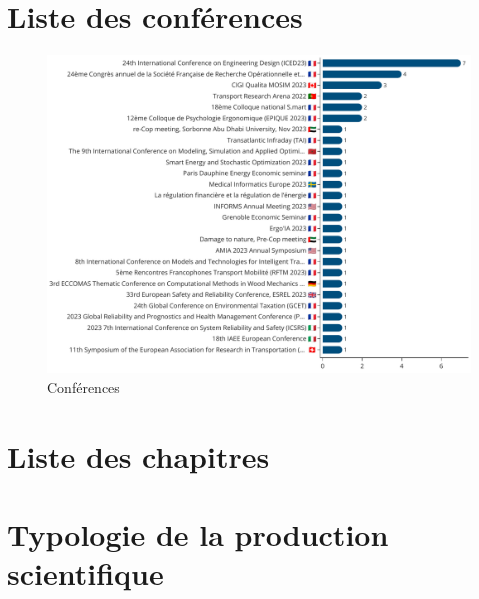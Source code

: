 \documentclass[french, 11pt]{assets/biso}
\begin{document}
{
  \footnotesize
  
}

\pagebreak

\section{Liste des conférences}

\begin{figure}[!h]
  \includegraphics[width=\textwidth]{figures/conferences.pdf}
  \centering
  \caption{Conférences}
  \label{fig_conferences}
\end{figure}


\pagebreak

\section{Liste des chapitres}

{
  \footnotesize
  
}


\pagebreak

\section{Typologie de la production scientifique}
\end{document}
